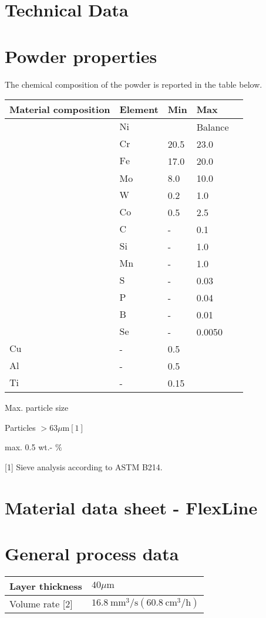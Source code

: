 \documentclass[10pt]{article}
\begin{document}
\section*{Technical Data}
\section*{Powder properties}
The chemical composition of the powder is reported in the table below.

\begin{center}
\begin{tabular}{lllll}
\hline
Material composition & Element & Min & Max \\
\hline
 & $\mathrm{Ni}$ &  & Balance \\
\hline
 & $\mathrm{Cr}$ & 20.5 & 23.0 \\
\hline
 & $\mathrm{Fe}$ & 17.0 & 20.0 \\
\hline
 & Mo & 8.0 & 10.0 \\
\hline
 & $\mathrm{W}$ & 0.2 & 1.0 \\
\hline
 & $\mathrm{Co}$ & 0.5 & 2.5 \\
\hline
 & $\mathrm{C}$ & - & 0.1 \\
\hline
 & $\mathrm{Si}$ & - & 1.0 \\
\hline
 & $\mathrm{Mn}$ & - & 1.0 \\
\hline
 & $\mathrm{S}$ & - & 0.03 \\
\hline
 & $\mathrm{P}$ & - & 0.04 \\
\hline
 & $\mathrm{B}$ & - & 0.01 \\
\hline
 & $\mathrm{Se}$ & - & 0.0050 \\
\hline
$\mathrm{Cu}$ & - & 0.5 &  \\
\hline
$\mathrm{Al}$ & - & 0.5 &  \\
\hline
$\mathrm{Ti}$ & - & 0.15 &  \\
\hline
\end{tabular}
\end{center}

Max. particle size

Particles $>63 \mu \mathrm{m}[1]$

max. 0.5 wt.- $\%$

[1] Sieve analysis according to ASTM B214.

\section*{Material data sheet - FlexLine}
\section*{General process data}
\begin{center}
\begin{tabular}{ll}
\hline
Layer thickness & $40 \mu \mathrm{m}$ \\
\hline
Volume rate [2] & $16.8 \mathrm{~mm}^{3} / \mathrm{s}\left(60.8 \mathrm{~cm}^{3} / \mathrm{h}\right)$ \\
\hline
\end{tabular}
\end{center}
\end{document}
